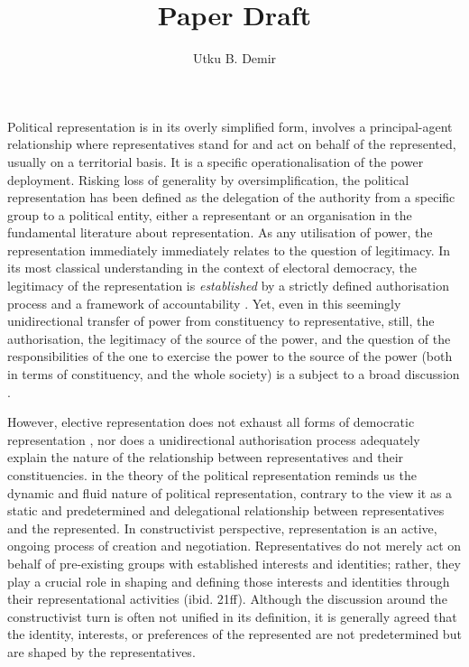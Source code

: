 \documentclass[nobib]{tufte-book}
\title{Paper Draft}
\author{Utku B. Demir}
\theoremstyle{mytheoremstyle}
\theoremstyle{mytheoremstyle}
\theoremstyle{myproblemstyle}
\begin{document}
    \maketitle
Political representation is in its overly simplified form, involves a principal-agent 
relationship where representatives stand for and act on behalf of the represented, 
usually on a territorial basis. It is a specific operationalisation 
of the power deployment. Risking loss of generality by oversimplification, the political 
representation has been defined as the delegation of the authority from a
specific group to a political entity, either a representant or an
organisation in the fundamental literature about representation. As any utilisation of power, 
the representation immediately immediately relates to the question of
legitimacy. In its most classical understanding in the context
of electoral democracy, the legitimacy of the representation is \textit{established} by a 
strictly defined authorisation process and a framework of accountability
\parencite{pitkin1967}. Yet, even in this seemingly unidirectional transfer 
of power from constituency to representative,  still, the authorisation,
the legitimacy of the source of the power, 
and the question of the responsibilities of the one to exercise the power
to the source of the power (both in terms of constituency, and the whole
society) is a subject to a broad discussion \parencite[see e.g.;][]{kelsen2017,
pitkin1967}. 


However, elective representation does not exhaust all forms of democratic
representation \parencite{saward2009}, nor does a unidirectional authorisation
process adequately explain the nature of the relationship between
representatives and their constituencies. 
\parencite{disch2019} in the theory of the political representation reminds us
the dynamic and fluid nature of political representation, contrary to the view it as a static and predetermined and delegational relationship between representatives and the represented. In constructivist perspective, representation is an active, ongoing process of creation and negotiation. Representatives do not merely act on behalf of pre-existing groups with established interests and identities; rather, they play a crucial role in shaping and defining those interests and identities through their representational activities (ibid. 21ff). Although the discussion around the constructivist turn is often not unified in its definition, it is generally agreed that the identity, interests, or preferences of the represented are not predetermined but are shaped by the representatives. 
\end{document}
